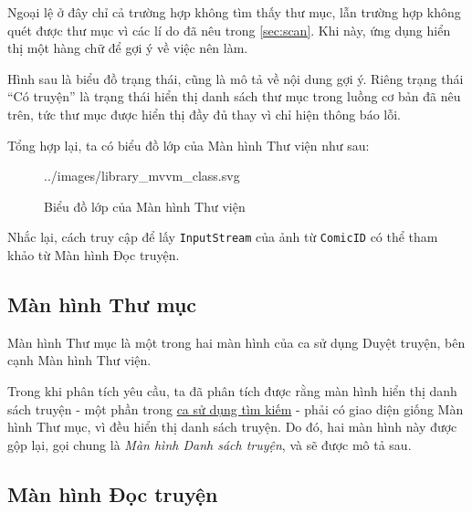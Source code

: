 \documentclass[../../../../thesis]{subfiles}
\begin{document}
Ngoại lệ ở đây chỉ cả trường hợp không tìm thấy thư mục, lẫn trường hợp không
quét được thư mục vì các lí do đã nêu trong \autoref{sec:scan}. Khi này, ứng
dụng hiển thị một hàng chữ để gợi ý về việc nên làm.

Hình sau là biểu đồ trạng thái, cũng là mô tả về nội dung gợi ý. Riêng trạng
thái ``Có truyện'' là trạng thái hiển thị danh sách thư mục trong luồng cơ bản
đã nêu trên, tức thư mục được hiển thị đầy đủ thay vì chỉ hiện thông báo lỗi.

Tổng hợp lại, ta có biểu đồ lớp của Màn hình Thư viện như sau:

\begin{figure}[H]
    \centering
    
        {../images/library_mvvm_class.svg}
    \caption{Biểu đồ lớp của Màn hình Thư viện}
    \label{fig:library_mvvm_class}
\end{figure}

Nhắc lại, cách truy cập để lấy \texttt{InputStream} của ảnh từ \texttt{ComicID}
có thể tham khảo từ Màn hình Đọc truyện.



\subsection{Màn hình Thư mục}\label{sec:folder-design}

Màn hình Thư mục là một trong hai màn hình của ca sử dụng Duyệt truyện, bên cạnh
Màn hình Thư viện.

Trong khi phân tích yêu cầu, ta đã phân tích được rằng màn hình hiển thị danh
sách truyện - một phần trong \hyperref[sec:search-comic]{ca sử dụng tìm kiếm} -
phải có giao diện giống Màn hình Thư mục, vì đều hiển thị danh sách truyện. Do
đó, hai màn hình này được gộp lại, gọi chung là \emph{Màn hình Danh sách
truyện}, và sẽ được mô tả sau.



\subsection{Màn hình Đọc truyện}\label{sec:reader-design}
\end{document}
